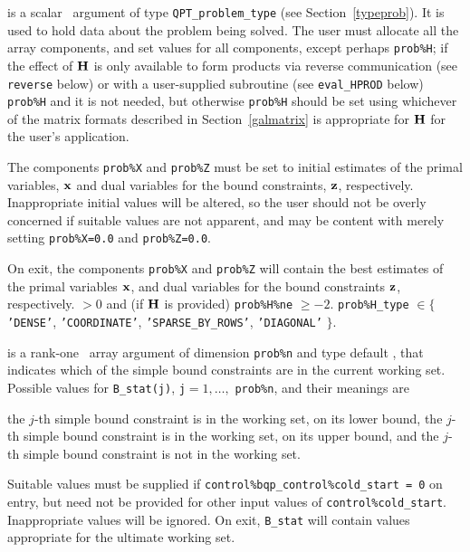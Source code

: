 \documentclass{galahad}
\begin{document}
\vspace*{-3mm}
\begin{description}
 is a scalar \intentinout\ argument of type 
{\tt QPT\_problem\_type}
(see Section~\ref{typeprob}). 
It is used to hold data about the problem being solved.
The user must allocate all the array components,
and set values for all components, except perhaps {\tt prob\%H};
if the effect of ${\mathbf{H}}$ is only available to form products 
via reverse communication (see {\tt reverse} below)
or with a user-supplied subroutine (see {\tt eval\_HPROD} below)
{\tt prob\%H} and it is not needed, but otherwise {\tt prob\%H} should be
set using whichever
of the matrix formats described in Section~\ref{galmatrix} 
is appropriate for ${\mathbf{H}}$ for the user's application.

The components {\tt prob\%X} and {\tt prob\%Z}
must be set to initial estimates of the primal variables, 
${\mathbf{x}}$ and dual variables for the bound constraints, ${\mathbf{z}}$, respectively.
Inappropriate initial values will be altered, so the user should
not be overly concerned if suitable values are not apparent, and may be
content with merely setting {\tt prob\%X=0.0}
and {\tt prob\%Z=0.0}.

On exit, the components {\tt prob\%X} and {\tt prob\%Z}
will contain the best estimates of the primal variables ${\mathbf{x}}$, 
and dual variables for the bound constraints ${\mathbf{z}}$, respectively.
 $> 0$
              and (if ${\mathbf{H}}$ is provided) {\tt prob\%H\%ne} $\geq -2$.
{\tt prob\%H\_type} $\in \{${\tt 'DENSE'}, 
 {\tt 'COORDINATE'}, {\tt 'SPARSE\_BY\_\-ROWS'}, {\tt 'DIAGONAL'} $\}$. 

 is a rank-one \intentinout\ array argument of dimension {\tt prob\%n}
and type default \integer, that indicates which of the simple bound 
constraints are in the current working set. Possible values for 
{\tt B\_stat(j)}, {\tt j}$=1, \ldots ,$ {\tt prob\%n}, and their meanings are
\begin{description}
 the $j$-th simple bound constraint 
is in the working set, on its lower bound,
 the $j$-th simple bound constraint 
is in the working set, on its upper bound, and
  the $j$-th simple bound constraint is not in the working set.
\end{description}
Suitable values must be supplied if 
{\tt control\%bqp\_control\%cold\_start = 0} on entry,
but need not be provided for other input values of {\tt control\%cold\_start}.
Inappropriate values will be ignored.
On exit, {\tt B\_stat} will contain values appropriate for the ultimate
working set.


\end{description}
\end{document}
